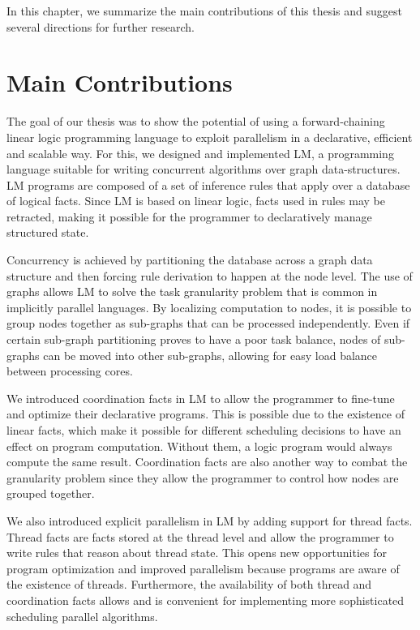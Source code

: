 
In this chapter, we summarize the main contributions of this thesis and suggest
several directions for further research.

\section{Main Contributions}

The goal of our thesis was to show the potential of using a forward-chaining
linear logic programming language to exploit parallelism in a declarative,
efficient and scalable way. For this, we designed and implemented LM, a
programming language suitable for writing concurrent algorithms over graph
data-structures. LM programs are composed of a set of inference rules that apply
over a database of logical facts.  Since LM is based on linear logic, facts used
in rules may be retracted, making it possible for the programmer to
declaratively manage structured state.

Concurrency is achieved by partitioning the database across a graph data
structure and then forcing rule derivation to happen at the node level. The use
of graphs allows LM to solve the task granularity problem that is common in
implicitly parallel languages. By localizing computation to nodes, it is
possible to group nodes together as sub-graphs that can be processed
independently. Even if certain sub-graph partitioning proves to have a poor task
balance, nodes of sub-graphs can be moved into other sub-graphs, allowing for
easy load balance between processing cores.

We introduced coordination facts in LM to allow the programmer to fine-tune and
optimize their declarative programs. This is possible due to the existence of
linear facts, which make it possible for different scheduling decisions to have
an effect on program computation. Without them, a logic program would always
compute the same result. Coordination facts are also another way to combat the
granularity problem since they allow the programmer to control how nodes are
grouped together.

We also introduced explicit parallelism in LM by adding support for thread
facts. Thread facts are facts stored at the thread level and allow the
programmer to write rules that reason about thread state. This opens new
opportunities for program optimization and improved parallelism because programs
are aware of the existence of threads. Furthermore, the availability of both
thread and coordination facts allows and is convenient for implementing more
sophisticated scheduling parallel algorithms.

